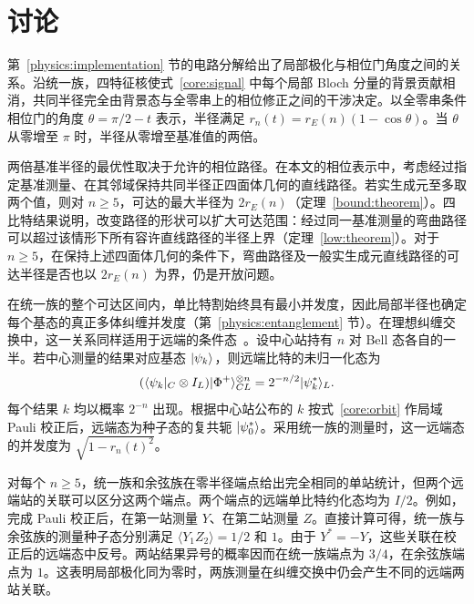 \section{讨论}
\label{discussion:section}

第~\ref{physics:implementation} 节的电路分解给出了局部极化与相位门角度之间的关系。沿统一族，四特征核使式~\eqref{core:signal} 中每个局部 Bloch 分量的背景贡献相消，共同半径完全由背景态与全零串上的相位修正之间的干涉决定。以全零串条件相位门的角度 $\theta=\pi/2-t$ 表示，半径满足 $r_n(t)=r_E(n)(1-\cos\theta)$。当 $\theta$ 从零增至 $\pi$ 时，半径从零增至基准值的两倍。

两倍基准半径的最优性取决于允许的相位路径。在本文的相位表示中，考虑经过指定基准测量、在其邻域保持共同半径正四面体几何的直线路径。若实生成元至多取两个值，则对 $n\ge5$，可达的最大半径为 $2r_E(n)$（定理~\ref{bound:theorem}）。四比特结果说明，改变路径的形状可以扩大可达范围：经过同一基准测量的弯曲路径可以超过该情形下所有容许直线路径的半径上界（定理~\ref{low:theorem}）。对于 $n\ge5$，在保持上述四面体几何的条件下，弯曲路径及一般实生成元直线路径的可达半径是否也以 $2r_E(n)$ 为界，仍是开放问题。

在统一族的整个可达区间内，单比特割始终具有最小并发度，因此局部半径也确定每个基态的真正多体纠缠并发度（第~\ref{physics:entanglement} 节）。在理想纠缠交换中，这一关系同样适用于远端的条件态~\cite{Zukowski1993,Huang2022}。设中心站持有 $n$ 对 Bell 态各自的一半。若中心测量的结果对应基态 $\lvert \psi_k\rangle$，则远端比特的未归一化态为
\begin{equation}
 (\langle \psi_k\rvert_C\otimes I_L)\lvert \Phi^+\rangle_{CL}^{\otimes n}
 =2^{-n/2}\lvert \psi_k^*\rangle_L.
 \label{discussion:swapping}
\end{equation}
每个结果 $k$ 均以概率 $2^{-n}$ 出现。根据中心站公布的 $k$ 按式~\eqref{core:orbit} 作局域 Pauli 校正后，远端态为种子态的复共轭 $\lvert \psi_0^*\rangle$。采用统一族的测量时，这一远端态的并发度为 $\sqrt{1-r_n(t)^2}$。

对每个 $n\ge5$，统一族和余弦族在零半径端点给出完全相同的单站统计，但两个远端站的关联可以区分这两个端点。两个端点的远端单比特约化态均为 $I/2$。例如，完成 Pauli 校正后，在第一站测量 $Y$、在第二站测量 $Z$。直接计算可得，统一族与余弦族的测量种子态分别满足 $\langle Y_1 Z_2\rangle=1/2$ 和 $1$。由于 $Y^*=-Y$，这些关联在校正后的远端态中反号。两站结果异号的概率因而在统一族端点为 $3/4$，在余弦族端点为 $1$。这表明局部极化同为零时，两族测量在纠缠交换中仍会产生不同的远端两站关联。
